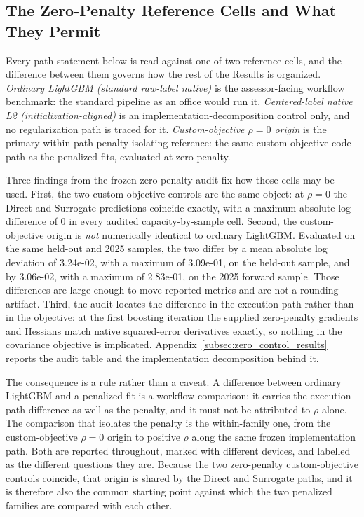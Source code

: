 \documentclass[10pt]{article}
\theoremstyle{definition}
\newcommand{\1}{\mathbf{1}}
\begin{document}
\subsection{The Zero-Penalty Reference Cells and What They Permit}
\label{subsec:zero_reference_result}

Every path statement below is read against one of two reference cells, and the
difference between them governs how the rest of the Results is organized. \emph{Ordinary LightGBM
(standard raw-label native)} is the assessor-facing workflow benchmark: the standard pipeline as an
office would run it. \emph{Centered-label native L2 (initialization-aligned)} is an
implementation-decomposition control only, and no regularization path is traced for it.
\emph{Custom-objective $\rho=0$ origin} is the primary within-path penalty-isolating reference: the
same custom-objective code path as the penalized fits, evaluated at zero penalty.

Three findings from the frozen zero-penalty audit fix how those cells may be used. First,
the two custom-objective controls are the same object: at $\rho=0$ the Direct and Surrogate
predictions coincide exactly, with a maximum absolute log difference of $0$ in every audited
capacity-by-sample cell. Second, the custom-objective origin is \emph{not} numerically identical to
ordinary LightGBM. Evaluated on the same held-out and 2025 samples, the two differ by a mean
absolute log deviation of 3.24e-02, with a maximum of 3.09e-01, on the held-out sample, and by
3.06e-02, with a maximum of
2.83e-01, on the 2025 forward sample. Those differences are large enough to move reported metrics
and are not a rounding artifact. Third, the audit locates the difference in the execution path
rather than in the objective: at the first boosting iteration the supplied zero-penalty gradients
and Hessians match native squared-error derivatives exactly, so nothing in the covariance objective
is implicated. Appendix~\ref{subsec:zero_control_results} reports the audit table and the
implementation decomposition behind it.

The consequence is a rule rather than a caveat. A difference between ordinary LightGBM
and a penalized fit is a workflow comparison: it carries the execution-path difference as well as
the penalty, and it must not be attributed to $\rho$ alone. The comparison that isolates the penalty
is the within-family one, from the custom-objective $\rho=0$ origin to positive $\rho$ along the same
frozen implementation path. Both are reported throughout, marked with different devices, and
labelled as the different questions they are. Because the two zero-penalty custom-objective controls
coincide, that origin is shared by the Direct and Surrogate paths, and it is therefore also the
common starting point against which the two penalized families are compared with each other.
\end{document}
